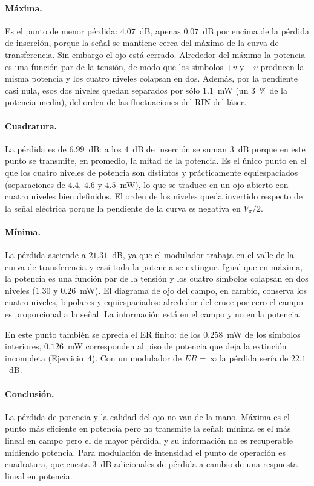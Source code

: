 \paragraph{Máxima.}
Es el punto de menor pérdida: $4.07$~dB, apenas $0.07$~dB por encima de la
pérdida de inserción, porque la señal se mantiene cerca del máximo de la
curva de transferencia. Sin embargo el ojo está cerrado. Alrededor del
máximo la potencia es una función par de la tensión, de modo que los
símbolos $+v$ y $-v$ producen la misma potencia y los cuatro niveles
colapsan en dos. Además, por la pendiente casi nula, esos dos niveles
quedan separados por sólo $1.1$~mW (un $3$~\% de la potencia media), del
orden de las fluctuaciones del RIN del láser.

\paragraph{Cuadratura.}
La pérdida es de $6.99$~dB: a los $4$~dB de inserción se suman $3$~dB
porque en este punto se transmite, en promedio, la mitad de la potencia.
Es el único punto en el que los cuatro niveles de potencia son distintos y
prácticamente equiespaciados (separaciones de $4.4$, $4.6$ y $4.5$~mW), lo
que se traduce en un ojo abierto con cuatro niveles bien definidos. El
orden de los niveles queda invertido respecto de la señal eléctrica porque
la pendiente de la curva es negativa en $V_\pi/2$.

\paragraph{Mínima.}
La pérdida asciende a $21.31$~dB, ya que el modulador trabaja en el valle
de la curva de transferencia y casi toda la potencia se extingue. Igual que
en máxima, la potencia es una función par de la tensión y los cuatro
símbolos colapsan en dos niveles ($1.30$ y $0.26$~mW). El diagrama de ojo
del campo, en cambio, conserva los cuatro niveles, bipolares y
equiespaciados: alrededor del cruce por cero el campo es proporcional a la
señal. La información está en el campo y no en la potencia.

En este punto también se aprecia el ER finito: de los $0.258$~mW de los
símbolos interiores, $0.126$~mW corresponden al piso de potencia que deja
la extinción incompleta (Ejercicio~4). Con un modulador de $ER = \infty$ la
pérdida sería de $22.1$~dB.

\paragraph{Conclusión.}
La pérdida de potencia y la calidad del ojo no van de la mano. Máxima es el
punto más eficiente en potencia pero no transmite la señal; mínima es el
más lineal en campo pero el de mayor pérdida, y su información no es
recuperable midiendo potencia. Para modulación de intensidad el punto de
operación es cuadratura, que cuesta $3$~dB adicionales de pérdida a cambio
de una respuesta lineal en potencia.

